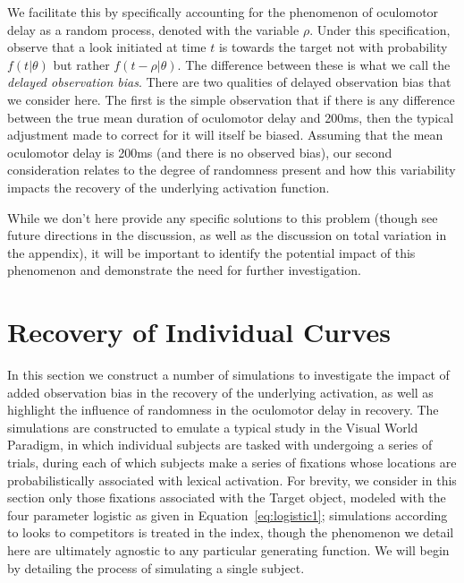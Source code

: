 \documentclass{article}
\begin{document}
We facilitate this by specifically accounting for the phenomenon of oculomotor delay as a random process, denoted with the variable $\rho$. Under this specification, observe that a look initiated at time $t$ is towards the target not with probability $f(t|\theta)$ but rather $f(t - \rho | \theta)$. The difference between these is what we call the \textit{delayed observation bias}. There are two  qualities of delayed observation bias that we consider here. The first is the simple observation that if there is any difference between the true mean duration of oculomotor delay and 200ms, then the typical adjustment made to correct for it will itself be biased. Assuming that the mean oculomotor delay is 200ms (and there is no observed bias), our second consideration relates to the degree of randomness present and how this variability impacts the recovery of the underlying activation function.

While we don't here provide any specific solutions to this problem (though see future directions in the discussion, as well as the discussion on total variation in the appendix), it will be important to identify the potential impact of this phenomenon and demonstrate the need for further investigation.





\section{Recovery of Individual Curves}\label{sec:ind_curves}



In this section we construct a number of simulations to investigate the impact of added observation bias in the recovery of the underlying activation, as well as highlight the influence of randomness in the oculomotor delay in recovery. The simulations are constructed to emulate a typical study in the Visual World Paradigm, in which individual subjects are tasked with undergoing a series of trials, during each of which subjects make a series of fixations whose locations are probabilistically associated with lexical activation. For brevity, we consider in this section only those fixations associated with the Target object, modeled with the four parameter logistic as given in Equation~\ref{eq:logistic1}; simulations according to looks to competitors is treated in the index, though the phenomenon we detail here are ultimately agnostic to any particular generating function. We will begin by detailing the process of simulating a single subject. 
\end{document}
